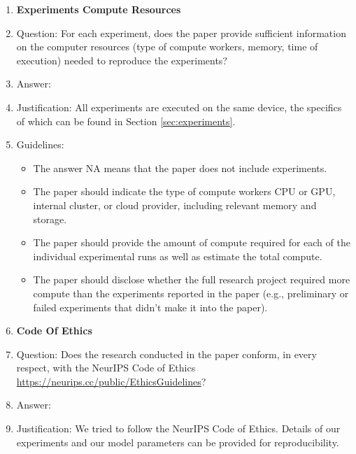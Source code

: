 \documentclass{article}
\begin{document}
\begin{enumerate}
\begin{itemize}
        \item For asymmetric distributions, the authors should be careful not to show in tables or figures symmetric error bars that would yield results that are out of range (e.g. negative error rates).
        \item If error bars are reported in tables or plots, The authors should explain in the text how they were calculated and reference the corresponding figures or tables in the text.
    \end{itemize}

\item {\bf Experiments Compute Resources}
    \item[] Question: For each experiment, does the paper provide sufficient information on the computer resources (type of compute workers, memory, time of execution) needed to reproduce the experiments?
    \item[] Answer: \answerYes{} %
    \item[] Justification: All experiments are executed on the same device, the specifics of which can be found in Section \ref{sec:experiments}.
    
    \item[] Guidelines:
    \begin{itemize}
        \item The answer NA means that the paper does not include experiments.
        \item The paper should indicate the type of compute workers CPU or GPU, internal cluster, or cloud provider, including relevant memory and storage.
        \item The paper should provide the amount of compute required for each of the individual experimental runs as well as estimate the total compute. 
        \item The paper should disclose whether the full research project required more compute than the experiments reported in the paper (e.g., preliminary or failed experiments that didn't make it into the paper). 
    \end{itemize}
    
\item {\bf Code Of Ethics}
    \item[] Question: Does the research conducted in the paper conform, in every respect, with the NeurIPS Code of Ethics \url{https://neurips.cc/public/EthicsGuidelines}?
    \item[] Answer: \answerYes{} %
    \item[] Justification: We tried to follow the NeurIPS Code of Ethics. Details of our experiments and our model parameters can be provided for reproducibility.
     

\end{enumerate}
\end{document}
